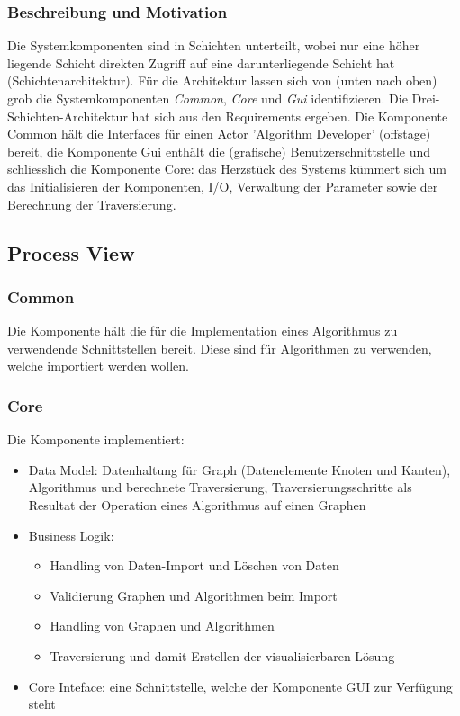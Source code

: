 \subsubsection{Beschreibung und Motivation}
Die Systemkomponenten sind in Schichten unterteilt, wobei nur eine h\"oher liegende Schicht direkten Zugriff auf eine darunterliegende Schicht hat (Schichtenarchitektur). F\"ur die Architektur lassen sich von (unten nach oben) grob die Systemkomponenten \textit{Common}, \textit{Core} und \textit{Gui} identifizieren. Die Drei-Schichten-Architektur hat sich aus den Requirements ergeben. Die Komponente Common h\"alt die Interfaces f\"ur einen Actor 'Algorithm Developer' (offstage) bereit, die Komponente Gui enth\"alt die (grafische) Benutzerschnittstelle und schliesslich die Komponente Core: das Herzst\"uck des Systems k\"ummert sich um das Initialisieren der Komponenten, I/O, Verwaltung der Parameter sowie der Berechnung der Traversierung.
% 
% 
% 
\subsection{Process View}
% 
\subsubsection{Common}
\label{subsubsec:Common}
Die Komponente h\"alt die f\"ur die Implementation eines Algorithmus zu verwendende Schnittstellen bereit. Diese sind f\"ur Algorithmen zu verwenden, welche importiert werden wollen.
% 
\subsubsection{Core}
\label{subsubsec:Core}
Die Komponente implementiert:
\begin{itemize}
  \item Data Model: Datenhaltung f\"ur Graph (Datenelemente Knoten und Kanten), Algorithmus und berechnete Traversierung, Traversierungsschritte als Resultat der Operation eines Algorithmus auf einen Graphen
  \item Business Logik: 
  \begin{itemize}
      \item Handling von Daten-Import und L\"oschen von Daten
      \item Validierung Graphen und Algorithmen beim Import
      \item Handling von Graphen und Algorithmen
      \item Traversierung und damit Erstellen der visualisierbaren L\"osung
  \end{itemize}
  \item Core Inteface: eine Schnittstelle, welche der Komponente GUI zur Verf\"ugung steht
\end{itemize}
% 
